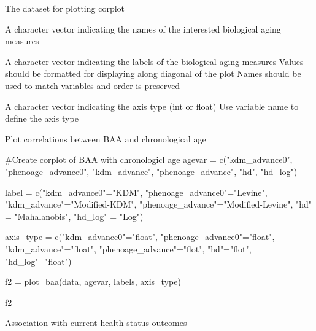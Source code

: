 \documentclass[a4paper]{book}
\begin{document}
%
\begin{Arguments}
\begin{ldescription}
\item[\code{data}] The dataset for plotting corplot

\item[\code{agevar}] A character vector indicating the names of the interested biological aging measures

\item[\code{label}] A character vector indicating the labels of the biological aging measures
Values should be formatted for displaying along diagonal of the plot
Names should be used to match variables and order is preserved

\item[\code{axis\_type}] A character vector indicating the axis type (int or float)
Use variable name to define the axis type
\end{ldescription}
\end{Arguments}
%
\begin{Details}\relax
Plot correlations between BAA and chronological age
\end{Details}
%
\begin{Examples}
\begin{ExampleCode}
#Create corplot of BAA with chronologicl age
agevar = c("kdm_advance0",
           "phenoage_advance0",
           "kdm_advance",
           "phenoage_advance",
           "hd",
           "hd_log")

label = c("kdm_advance0"="KDM\nBiological\nAge",
           "phenoage_advance0"="Levine\nPhenotypic\nAge",
           "kdm_advance"="Modified-KDM\nBiological\nAge",
           "phenoage_advance"="Modified-Levine\nPhenotypic\nAge",
           "hd" = "Mahalanobis\nDistance",
           "hd_log" = "Log\nMahalanobis\nDistance")

axis_type = c("kdm_advance0"="float",
              "phenoage_advance0"="float",
              "kdm_advance"="float",
              "phenoage_advance"="flot",
              "hd"="flot",
              "hd_log"="float")

f2 = plot_baa(data, agevar, labels, axis_type)

f2

\end{ExampleCode}
\end{Examples}
%
\begin{Description}\relax
Association with current health status outcomes
\end{Description}
\end{document}
